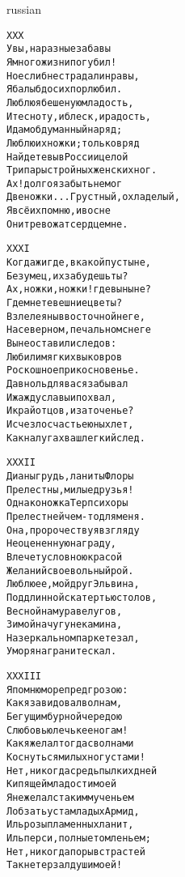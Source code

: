 \documentclass[12pt,twocolumn]{article}
\begin{document}
\begin{center}
\begin{otherlanguage*}{russian}
\begin{minipage}[t]{\dimexpr 0.5\textwidth -\tabcolsep-.5pt}
\begin{alltt}\normalfont\centering
XXX
Увы, на разные забавы
Я много жизни погубил!
Но если б не страдали нравы,
Я балы б до сих пор любил.
Люблю я бешеную младость,
И тесноту, и блеск, и радость,
И дам обдуманный наряд;
Люблю их ножки; только вряд
Найдете вы в России целой
Три пары стройных женских ног.
Ах! долго я забыть не мог
Две ножки... Грустный, охладелый,
Я всё их помню, и во сне
Они тревожат сердце мне.
\end{alltt}
\end{minipage}
\clearpage

\begin{minipage}[t]{\dimexpr 0.5\textwidth -\tabcolsep-.5pt}
\begin{alltt}\normalfont\centering
XXXI
Когда ж и где, в какой пустыне,
Безумец, их забудешь ты?
Ах, ножки, ножки! где вы ныне?
Где мнете вешние цветы?
Взлелеяны в восточной неге,
На северном, печальном снеге
Вы не оставили следов:
Любили мягких вы ковров
Роскошное прикосновенье.
Давно ль для вас я забывал
И жажду славы и похвал,
И край отцов, и заточенье?
Исчезло счастье юных лет,
Как на лугах ваш легкий след.
\end{alltt}
\end{minipage}

\begin{minipage}[t]{\dimexpr 0.5\textwidth -\tabcolsep-.5pt}
\begin{alltt}\normalfont\centering
XXXII
Дианы грудь, ланиты Флоры
Прелестны, милые друзья!
Однако ножка Терпсихоры
Прелестней чем-то для меня.
Она, пророчествуя взгляду
Неоцененную награду,
Влечет условною красой
Желаний своевольный рой.
Люблю ее, мой друг Эльвина,
Под длинной скатертью столов,
Весной на мураве лугов,
Зимой на чугуне камина,
На зеркальном паркете зал,
У моря на граните скал.
\end{alltt}
\end{minipage}
\clearpage

\begin{minipage}[t]{\dimexpr 0.5\textwidth -\tabcolsep-.5pt}
\begin{alltt}\normalfont\centering
XXXIII
Я помню море пред грозою:
Как я завидовал волнам,
Бегущим бурной чередою
С любовью лечь к ее ногам!
Как я желал тогда с волнами
Коснуться милых ног устами!
Нет, никогда средь пылких дней
Кипящей младости моей
Я не желал с таким мученьем
Лобзать уста младых Армид,
Иль розы пламенных ланит,
Иль перси, полные томленьем;
Нет, никогда порыв страстей
Так не терзал души моей!
\end{alltt}
\end{minipage}


\end{otherlanguage*}
\end{center}
\end{document}
